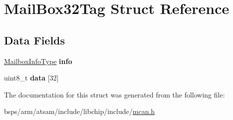 \hypertarget{structMailBox32Tag}{}\section{Mail\+Box32\+Tag Struct Reference}
\label{structMailBox32Tag}
\subsection*{Data Fields}
\begin{DoxyCompactItemize}
\item 
\mbox{\label{structMailBox32Tag_aeeb4d2f0c8a0a25fd29089d0eb5a824b}} 
\mbox{\hyperlink{structMailboxInfoTag}{Mailbox\+Info\+Type}} {\bfseries info}
\item 
\mbox{\label{structMailBox32Tag_a0030af8b1478be8d0f7af3d7129a7523}} 
uint8\+\_\+t {\bfseries data} \mbox{[}32\mbox{]}
\end{DoxyCompactItemize}


The documentation for this struct was generated from the following file\+:\begin{DoxyCompactItemize}
\item 
bsps/arm/atsam/include/libchip/include/\mbox{\hyperlink{mcan_8h}{mcan.\+h}}\end{DoxyCompactItemize}
